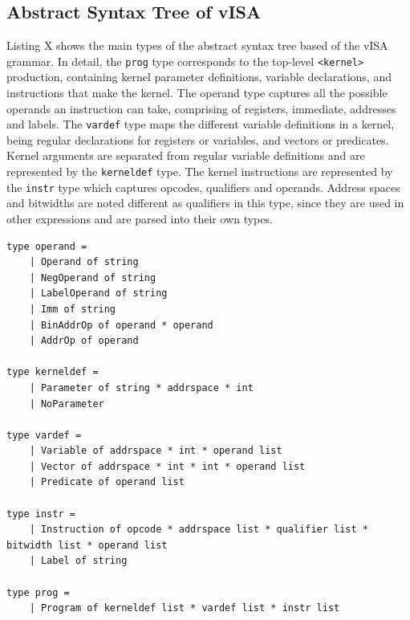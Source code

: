 \subsection{Abstract Syntax Tree of vISA}
Listing X shows the main types of the abstract syntax tree based of the vISA
grammar. In detail, the \texttt{prog} type corresponds to the top-level
\texttt{<kernel>} production, containing kernel parameter definitions, variable
declarations, and instructions that make the kernel. The operand type captures
all the possible operands an instruction can take, comprising of registers,
immediate, addresses and labels. The \texttt{vardef} type maps the different
variable definitions in a kernel, being regular declarations for registers or
variables, and vectors or predicates. Kernel arguments are separated from
regular variable definitions and are represented by the \texttt{kerneldef}
type. The kernel instructions are represented by the \texttt{instr} type which
captures opcodes, qualifiers and operands. Address spaces and bitwidths are
noted different as qualifiers in this type, since they are used in other
expressions and are parsed into their own types.

\begin{lstlisting}
type operand =
    | Operand of string
    | NegOperand of string
    | LabelOperand of string
    | Imm of string
    | BinAddrOp of operand * operand
    | AddrOp of operand

type kerneldef =
    | Parameter of string * addrspace * int
    | NoParameter

type vardef =
    | Variable of addrspace * int * operand list
    | Vector of addrspace * int * int * operand list
    | Predicate of operand list
    
type instr = 
    | Instruction of opcode * addrspace list * qualifier list * bitwidth list * operand list
    | Label of string

type prog = 
    | Program of kerneldef list * vardef list * instr list
\end{lstlisting}

